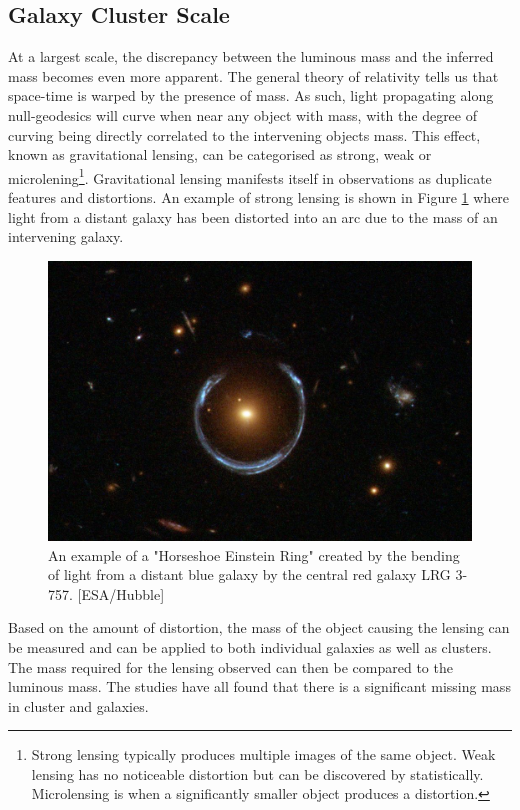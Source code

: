 \subsection{Galaxy Cluster Scale}
\par
At a largest scale, the discrepancy between the luminous mass and the inferred mass becomes even more apparent.
The general theory of relativity tells us that space-time is warped by the presence of mass.
As such, light propagating along null-geodesics will curve when near any object with mass, with the degree of curving being directly correlated to the intervening objects mass.
This effect, known as gravitational lensing, can be categorised as strong, weak or microlening\footnote{Strong lensing typically produces multiple images of the same object. Weak lensing has no noticeable distortion but can be discovered by statistically. Microlensing is when a significantly smaller object produces a distortion.}. 
Gravitational lensing manifests itself in observations as duplicate features and distortions.
An example of strong lensing is shown in Figure \ref{fig:DM_Evidence_Einstein_Ring} where light from a distant galaxy has been distorted into an arc due to the mass of an intervening galaxy.

\begin{figure}[!htbp]%
    \centering
    \includegraphics[scale=0.5]{Figures/DarkMatterEvidence/Einstein_Ring_from_Hubble.JPG}
    \caption{An example of a "Horseshoe Einstein Ring" created by the bending of light from a distant blue galaxy by the central red galaxy LRG 3-757. [ESA/Hubble]}
    \label{fig:DM_Evidence_Einstein_Ring}
\end{figure}

Based on the amount of distortion, the mass of the object causing the lensing can be measured and can be applied to both individual galaxies as well as clusters.
The mass required for the lensing observed can then be compared to the luminous mass.
The studies have all found that there is a significant missing mass in cluster and galaxies.

